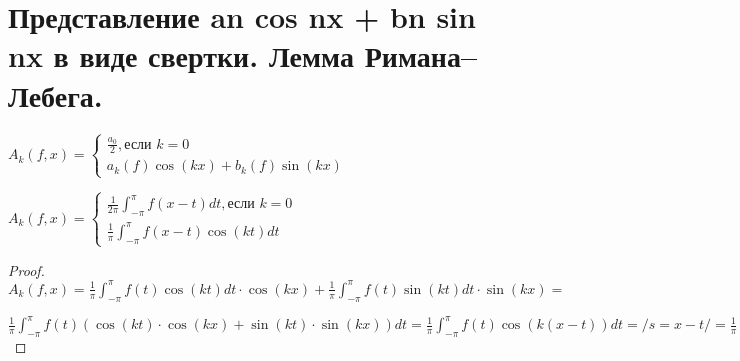 \section{Представление an cos nx + bn sin nx в виде
свертки. Лемма Римана–Лебега.}

\begin{designation}
    $A_k(f, x) =\begin{cases}
            \frac{a_0}{2}, \text{если $k = 0$} \\
            a_k(f)\cos(kx) + b_k(f)\sin(kx)
        \end{cases} $
\end{designation}

\begin{observation}
    $A_k(f, x) =\begin{cases}
            \frac{1}{2\pi}\int_{-\pi}^\pi f(x-t)dt, \text{если $k = 0$} \\
            \frac{1}{\pi}\int_{-\pi}^\pi f(x-t)\cos(kt)dt
        \end{cases} $
\end{observation}

\begin{proof}
    $A_k(f, x) = \frac{1}{\pi}\int_{-\pi}^\pi f(t)\cos(kt)dt \cdot \cos(kx) + \frac{1}{\pi}\int_{-\pi}^\pi f(t)\sin(kt)dt\cdot \sin(kx) =$

    $ \frac{1}{\pi}\int_{-\pi}^\pi f(t)(\cos(kt)\cdot \cos(kx) + \sin(kt)\cdot\sin(kx))dt = \frac{1}{\pi}\int_{-\pi}^\pi f(t)\cos(k(x - t))dt = /s = x - t/ =
        \frac{1}{\pi}\int_{-\pi}^\pi f(x- s)\cos(ks)ds$
\end{proof}

